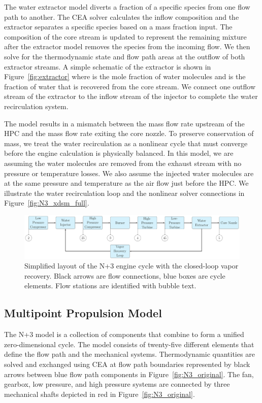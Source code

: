 \documentclass[conf]{new-aiaa}
\begin{document}
The water extractor model diverts a fraction of a specific species from one flow path to another.
The CEA solver calculates the inflow composition and the extractor separates a specific species based on a mass fraction input.
The composition of the core stream is updated to represent the remaining mixture after the extractor model removes the species from the incoming flow.
We then solve for the thermodynamic state and flow path areas at the outflow of both extractor streams.
A simple schematic of the extractor is shown in Figure~\ref{fig:extractor} where  is the mole fraction of water molecules and  is the fraction of water that is recovered from the core stream.
We connect one outflow stream of the extractor to the inflow stream of the injector to complete the water recirculation system.

The model results in a mismatch between the mass flow rate upstream of the HPC and the mass flow rate exiting the core nozzle.
To preserve conservation of mass, we treat the water recirculation as a nonlinear cycle that must converge before the engine calculation is physically balanced.
In this model, we are assuming the water molecules are removed from the exhaust stream with no pressure or temperature losses.
We also assume the injected water molecules are at the same pressure and temperature as the air flow just before the HPC.
We illustrate the water recirculation loop and the nonlinear solver connections in Figure~\ref{fig:N3_xdsm_full}.

\begin{figure}[hbt!]
  \centering
  \includegraphics[width=1.0\textwidth]{N3_CLVR_cycle.pdf}
  \caption{
    Simplified layout of the N+3 engine cycle with the closed-loop vapor recovery.
    Black arrows are flow connections, blue boxes are cycle elements.
    Flow stations are identified with bubble text.
  }
  \label{fig:n3_clvr}
\end{figure}

\subsection{Multipoint Propulsion Model}
The N+3 model is a collection of components that combine to form a unified zero-dimensional cycle.
The model consists of twenty-five different elements that define the flow path and the mechanical systems.
Thermodynamic quantities are solved and exchanged using CEA at flow path boundaries represented by black arrows between blue flow path components in Figure~\ref{fig:N3_original}.
The fan, gearbox, low pressure, and high pressure systems are connected by three mechanical shafts depicted in red in Figure~\ref{fig:N3_original}.
\end{document}
